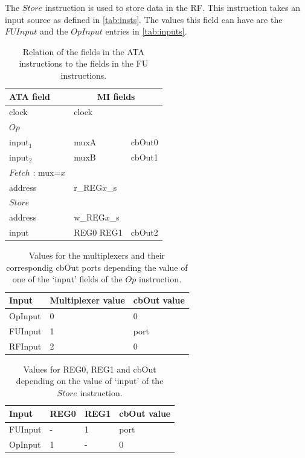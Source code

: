 The $Store$ instruction is used to store data in the RF. This instruction takes an input source as defined in \ref{tab:insts}. The values this field can have are the $FUInput$ and the $OpInput$ entries in \ref{tab:inputs}.

\newcommand{\rowgroup}[1]{\hspace{-0.5em}#1}
\begin{table}
    \centering
    \begin{tabular}{lll@{}}
        \toprule
        ATA field &  \multicolumn{2}{c}{MI fields}\\
        \hline
        clock & clock\\
        \rowgroup{$Op$}\\
        input$_1$ & muxA & cbOut0\\
        input$_2$ & muxB & cbOut1\\
        \rowgroup{$Fetch$ : mux=$x$}\\
        address & r\_REG$x$\_s\\
        \rowgroup{$Store$}\\
        address & w\_REG$x$\_s\\
        input & REG0 REG1 & cbOut2\\
        \bottomrule
    \end{tabular}
    \caption{Relation of the fields in the ATA instructions to the fields in the FU instructions.}
    \label{tab:ATA-MC}
\end{table}

\begin{table}
    \centering
    \begin{tabular}{@{}lll@{}}
        \toprule
        Input & Multiplexer value & cbOut value\\
        \hline
        OpInput & 0 & 0\\
        FUInput & 1 & port\\
        RFInput & 2 & 0\\
        \bottomrule
    \end{tabular}
    \caption{Values for the multiplexers and their correspondig cbOut ports depending the value of one of the `input' fields of the $Op$ instruction.}
    \label{tab:mux}
\end{table}

\begin{table}
    \centering
    \begin{tabular}{@{}llll@{}}
        \toprule
        Input & REG0 & REG1 & cbOut value\\
        \hline
        FUInput & - & 1 & port\\
        OpInput & 1 & - & 0\\
        \bottomrule
    \end{tabular}
    \caption{Values for REG0, REG1 and cbOut depending on the value of `input' of the $Store$ instruction.}
    \label{tab:reg}
\end{table}


